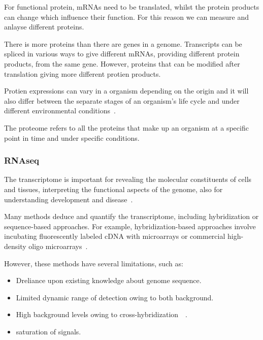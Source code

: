 \documentclass[]{final_report}
\begin{document}
For functional protein, mRNAs need to be translated, whilst the protein products can change which influence their function. For this reason we can measure and anlayse different proteins. 

There is more proteins than there are genes in a genome. Transcripts can be spliced in various ways to give different mRNAs, providing different protein products, from the same gene. However, proteins that can be modified after translation giving more different protien products.

Protien expressions can vary in a organism depending on the origin and it will also differ between the separate stages of an organism’s life cycle and under different environmental conditions~\cite{zvelebil_understanding_2008}.

\begin{definition}[proteome]
    The proteome refers to all the proteins that make up an organism at a specific point in time and under specific conditions.
\end{definition}

\clearpage

\subsubsection{RNAseq}

The transcriptome is important for revealing the molecular constituents of cells and tissues, interpreting the functional aspects of the genome, also for understanding development and disease~\cite{wang_rna-seq_2009}.

Many methods deduce and quantify the transcriptome, including hybridization or sequence-based approaches. For example, hybridization-based approaches involve incubating fluorescently labeled cDNA with microarrays or commercial high-density oligo microarrays~\cite{wang_rna-seq_2009}.

However, these methods have several limitations, such as: 
\begin{itemize}
    \item Dreliance upon existing knowledge about genome sequence.
    \item Limited dynamic range of detection owing to both background.
    \item High background levels owing to cross-hybridization~\cite{okoniewski_hybridization_2006}~\cite{royce_toward_2007}.
    \item saturation of signals.
\end{itemize}
\end{document}
